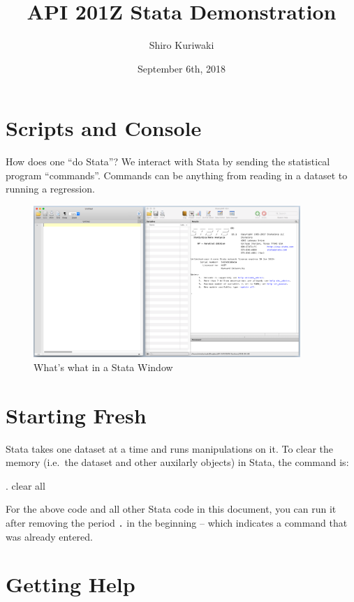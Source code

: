 \documentclass[]{article}
\title{API 201Z Stata Demonstration}
\author{Shiro Kuriwaki}
\date{September 6th, 2018}
\begin{document}
\maketitle

\section{Scripts and Console}\label{scripts-and-console}

How does one ``do Stata''? We interact with Stata by sending the
statistical program ``commands''. Commands can be anything from reading
in a dataset to running a regression.

\begin{figure}
\centering
\includegraphics[width=0.90000\textwidth]{statawindow.png}
\caption{What's what in a Stata Window}
\end{figure}

\section{Starting Fresh}\label{starting-fresh}

Stata takes one dataset at a time and runs manipulations on it. To clear
the memory (i.e.~the dataset and other auxilarly objects) in Stata, the
command is:

\begin{stlog}
. clear all
{\smallskip}
\end{stlog}

For the above code and all other Stata code in this document, you can
run it after removing the period \texttt{.} in the beginning -- which
indicates a command that was already entered.

\section{Getting Help}\label{getting-help}
\end{document}
